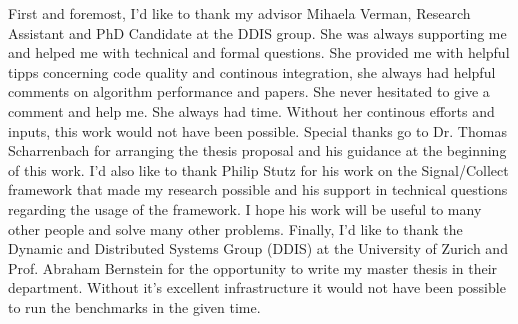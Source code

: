 \begin{acknowledgements}

\end{acknowledgements}

First and foremost, I'd like to thank my advisor Mihaela Verman, Research Assistant and PhD Candidate at the DDIS group. She was always supporting me and helped me with technical and formal questions. She provided me with helpful tipps concerning code quality and continous integration, she always had helpful comments on algorithm performance and papers. She never hesitated to give a comment and help me. She always had time. Without her continous efforts and inputs, this work would not have been possible. \newline
Special thanks go to Dr. Thomas Scharrenbach for arranging the thesis proposal and his guidance at the beginning of this work. I'd also like to thank Philip Stutz for his work on the Signal/Collect framework that made my research possible and his support in technical questions regarding the usage of the framework. I hope his work will be useful to many other people and solve many other problems. \newline
Finally, I'd like to thank the Dynamic and Distributed Systems Group (DDIS) at the University of Zurich and Prof. Abraham Bernstein for the opportunity to write my master thesis in their department. Without it's excellent infrastructure it would not have been possible to run the benchmarks in the given time.
